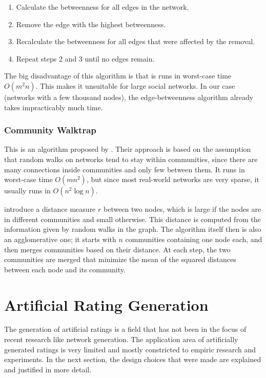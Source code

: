 \begin{enumerate}
\item Calculate the betweenness for all edges in the network.
\item Remove the edge with the highest betweenness.
\item Recalculate the betweenness for all edges that were affected by the removal.
\item Repeat steps 2 and 3 until no edges remain.
\end{enumerate}

The big disadvantage of this algorithm is that is runs in worst-case time $O(m^2n)$. This makes it unsuitable for large social networks. In our case (networks with a few thousand nodes), the edge-betweenness algorithm already takes impracticably much time.

\subsubsection{Community Walktrap}
\label{ssst:communitywalktrap} This is an algorithm proposed by \cite{Pons_2005}. Their approach is based on the assumption that random walks on networks tend to stay within communities, since there are many connections inside communities and only few between them. It runs in worst-case time $O(m n^2)$, but since most real-world networks are very sparse, it usually runs in $O(n^2\log n)$.

\cite{Pons_2005} introduce a distance measure $r$ between two nodes, which is large if the nodes are in different communities and small otherwise. This distance is computed from the information given by random walks in the graph. The algorithm itself then is also an agglomerative one; it starts with $n$ communities containing one node each, and then merges communities based on their distance. At each step, the two communities are merged that minimize the mean of the squared distances between each node and its community.
\section{Artificial Rating Generation}
\label{st:artificialratinggeneration} The generation of artificial ratings is a field that has not been in the focus of recent research like network generation. The application area of artificially generated ratings is very limited and mostly constricted to empiric research and experiments. In the next section, the design choices that were made are explained and justified in more detail.

